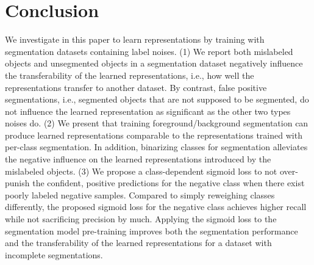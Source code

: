\section{Conclusion}
\label{sec:conclusion}

We investigate in this paper to learn representations by training with segmentation datasets containing label noises.
(1) We report both mislabeled objects and unsegmented objects in a segmentation dataset negatively influence the transferability of the learned representations, i.e., how well the representations transfer to another dataset.
By contrast, false positive segmentations, i.e., segmented objects that are not supposed to be segmented, do not influence the learned representation as significant as the other two types noises do.
(2) We present that training foreground/background segmentation can produce learned representations comparable to the representations trained with per-class segmentation.
In addition, binarizing classes for segmentation alleviates the negative influence on the learned representations introduced by the mislabeled objects.
(3) We propose a class-dependent sigmoid loss to not over-punish the confident, positive predictions for the negative class when there exist poorly labeled negative samples.
Compared to simply reweighing classes differently, the proposed sigmoid loss for the negative class achieves higher recall while not sacrificing precision by much.
Applying the sigmoid loss to the segmentation model pre-training improves both the segmentation performance and the transferability of the learned representations for a dataset with incomplete segmentations.
